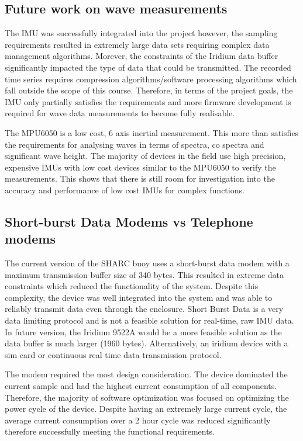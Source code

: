 \subsection{Future work on wave measurements}

The IMU was successfully integrated into the project however, the sampling requirements resulted in extremely large data sets requiring complex data management algorithms. Morever, the constraints of the Iridium data buffer significantly impacted the type of data that could be transmitted. The recorded time series requires compression algorithms/software processing algorithms which fall outside the scope of this course. Therefore, in terms of the project goals, the IMU only partially satisfies the requirements and more firmware development is required for wave data measurements to become fully realisable.

The MPU6050 is a low cost, 6 axis inertial measurement. This more than satisfies the requirements for analysing waves in terms of spectra, co spectra and significant wave height. The majority of devices in the field use high precision, expensive IMUs with low cost devices similar to the MPU6050 to verify the measurements. This shows that there is still room for investigation into the accuracy and performance of low cost IMUs for complex functions. 

\subsection{Short-burst Data Modems vs Telephone modems}

The current version of the SHARC buoy uses a short-burst data modem with a maximum transmission buffer size of 340 bytes. This resulted in extreme data constraints which reduced the functionality of the system. Despite this complexity, the device was well integrated into the system and was able to reliably transmit data even through the enclosure. Short Burst Data is a very data limiting protocol and is not a feasible solution for real-time, raw IMU data. In future version, the Iridium 9522A would be a more feasible solution as the data buffer is much larger (1960 bytes). Alternatively, an iridium device with a sim card or continuous real time data transmission protocol.\par

The modem required the most design consideration. The device dominated the current sample and had the highest current consumption of all components. Therefore, the majority of software optimization was focused on optimizing the power cycle of the device. Despite having an extremely large current cycle, the average current consumption over a 2 hour cycle was reduced significantly therefore successfully meeting the functional requirements.

